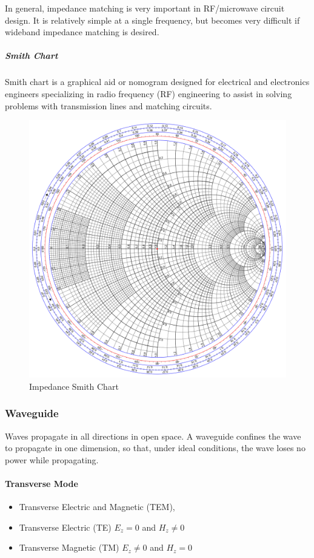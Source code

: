 In general, impedance matching is very important in RF/microwave circuit design. It is relatively simple at a single frequency, but becomes very difficult if wideband impedance matching is desired.

\subparagraph{Smith Chart} Smith chart is a graphical aid or nomogram designed for electrical and electronics engineers specializing in radio frequency (RF) engineering to assist in solving problems with transmission lines and matching circuits.

\begin{figure}
  \centering
  \includegraphics[width=4.5in]{fig/1300px-Smith_chart_gen.svg.png}
  \caption{Impedance Smith Chart}\label{fig_smith_chart}
\end{figure}

\subsubsection{Waveguide}
Waves propagate in all directions in open space. A waveguide confines the wave to propagate in one dimension, so that, under ideal conditions, the wave loses no power while propagating.

\paragraph{Transverse Mode}

\begin{itemize}
  \item Transverse Electric and Magnetic (TEM),
  \item Transverse Electric (TE) $E_z = 0$ and $H_z \neq 0$
  \item Transverse Magnetic (TM) $E_z \neq 0$ and $H_z = 0$
\end{itemize}

